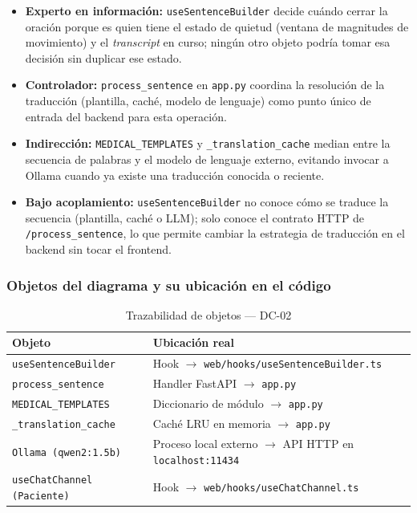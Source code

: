 \begin{itemize}[leftmargin=*, itemsep=2pt]
    \item \textbf{Experto en información:} \texttt{useSentenceBuilder} decide
    cuándo cerrar la oración porque es quien tiene el estado de quietud
    (ventana de magnitudes de movimiento) y el \textit{transcript} en curso;
    ningún otro objeto podría tomar esa decisión sin duplicar ese estado.
    \item \textbf{Controlador:} \texttt{process\_sentence} en \texttt{app.py}
    coordina la resolución de la traducción (plantilla, caché, modelo de
    lenguaje) como punto único de entrada del backend para esta operación.
    \item \textbf{Indirección:} \texttt{MEDICAL\_TEMPLATES} y
    \texttt{\_translation\_cache} median entre la secuencia de palabras y el
    modelo de lenguaje externo, evitando invocar a Ollama cuando ya existe
    una traducción conocida o reciente.
    \item \textbf{Bajo acoplamiento:} \texttt{useSentenceBuilder} no conoce
    cómo se traduce la secuencia (plantilla, caché o LLM); solo conoce el
    contrato HTTP de \texttt{/process\_sentence}, lo que permite cambiar la
    estrategia de traducción en el backend sin tocar el frontend.
\end{itemize}

\subsubsection{Objetos del diagrama y su ubicación en el código}

\begin{table}[H]
\centering
\begin{tabularx}{\textwidth}{@{}l X@{}}
\toprule
\textbf{Objeto} & \textbf{Ubicación real} \\
\midrule
\texttt{useSentenceBuilder} & Hook $\rightarrow$ \texttt{web/hooks/useSentenceBuilder.ts} \\
\texttt{process\_sentence} & Handler FastAPI $\rightarrow$ \texttt{app.py} \\
\texttt{MEDICAL\_TEMPLATES} & Diccionario de módulo $\rightarrow$ \texttt{app.py} \\
\texttt{\_translation\_cache} & Caché LRU en memoria $\rightarrow$ \texttt{app.py} \\
\texttt{Ollama (qwen2:1.5b)} & Proceso local externo $\rightarrow$ API HTTP en \texttt{localhost:11434} \\
\texttt{useChatChannel (Paciente)} & Hook $\rightarrow$ \texttt{web/hooks/useChatChannel.ts} \\
\bottomrule
\end{tabularx}
\caption{Trazabilidad de objetos --- DC-02}
\label{tab:col-objetos-dc02}
\end{table}

